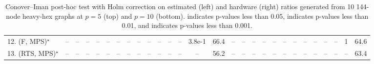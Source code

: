 \begin{table}[ht]
{\begin{tabular}{l|cccccccccccccc|ccccccccccccc|}
12. (F, MPS)$^\star$ & -- & -- & -- & -- & -- & -- & -- & -- & -- & -- & -- & -- & 3.8e-1 & 66.4 & -- & -- & -- & -- & -- & -- & -- & -- & -- & -- & -- & 1 & 64.6 \\
13. (RTS, MPS)$^\star$ & -- & -- & -- & -- & -- & -- & -- & -- & -- & -- & -- & -- & -- & 56.2 & -- & -- & -- & -- & -- & -- & -- & -- & -- & -- & -- & -- & 63.4 \\
\hline

\end{tabular}
}
\caption{Conover–Iman post-hoc test with Holm correction on estimated (left) and hardware (right) ratios generated from 10 144-node heavy-hex graphs at $p=5$ (top) and $p=10$ (bottom).  indicates p-values less than 0.05,  indicates p-values less than 0.01, and  indicates p-values less than 0.001.}
\label{tab:N144HH73_5_10_100pc_hw}
\end{table}